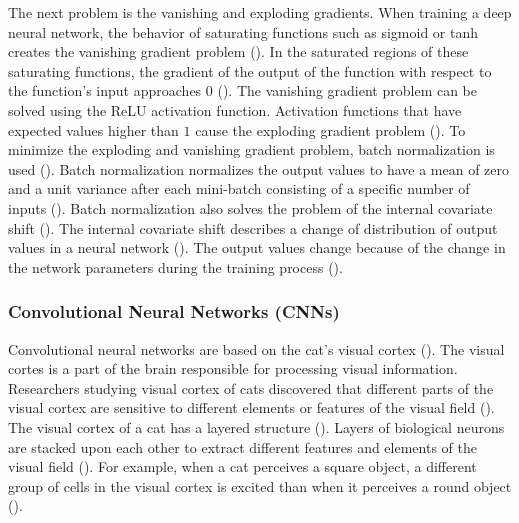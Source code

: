 \documentclass{BachelorBUI}
\begin{document}
                The next problem is the vanishing and exploding gradients. When training a deep neural network, the behavior of saturating functions such as sigmoid or tanh creates the vanishing gradient problem (\cite{Murphy:2022}). In the saturated regions of these saturating functions, the gradient of the output of the function with respect to the function's input approaches $0$ (\cite{Murphy:2022}). The vanishing gradient problem can be solved using the ReLU activation function. Activation functions that have expected values higher than $1$ cause the exploding gradient problem (\cite{Aggarwal:2018}). To minimize the exploding and vanishing gradient problem, batch normalization is used (\cite{Aggarwal:2018}). Batch normalization normalizes the output values to have a mean of zero and a unit variance after each mini-batch consisting of a specific number of inputs (\cite{Szegedy:2015:2}). Batch normalization also solves the problem of the internal covariate shift (\cite{Aggarwal:2018}). The internal covariate shift describes a change of distribution of output values in a neural network (\cite{Szegedy:2015:2}). The output values change because of the change in the network parameters during the training process (\cite{Szegedy:2015:2}).
 

        \subsubsection{Convolutional Neural Networks (CNNs)} 
        \label{subsub:convolutional-neural-networks}

        Convolutional neural networks are based on the cat's visual cortex (\cite{Aggarwal:2018}). The visual cortes is a part of the brain responsible for processing visual information. Researchers studying visual cortex of cats discovered that different parts of the visual cortex are sensitive to different elements or features of the visual field (\cite{Aggarwal:2018}). The visual cortex of a cat has a layered structure (\cite{Aggarwal:2018}). Layers of biological neurons are stacked upon each other to extract different features and elements of the visual field (\cite{Aggarwal:2018}). For example, when a cat perceives a square object, a different group of cells in the visual cortex is excited than when it perceives a round object (\cite{Aggarwal:2018}). 
        
\end{document}
